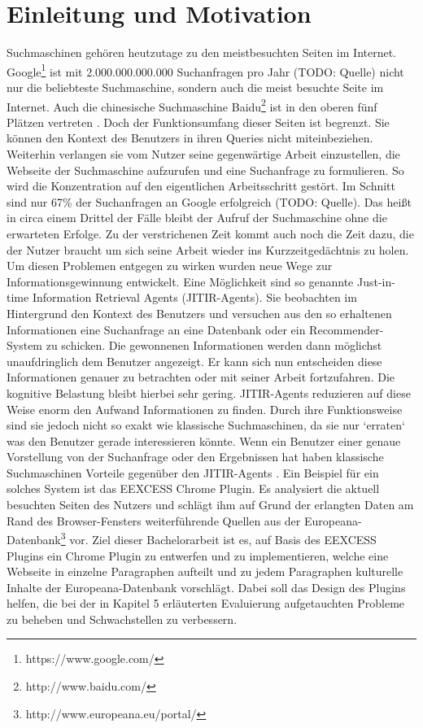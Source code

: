 \section{Einleitung und Motivation}
Suchmaschinen gehören heutzutage zu den meistbesuchten Seiten im Internet. Google\footnote{https://www.google.com/} ist mit 2.000.000.000.000 Suchanfragen pro Jahr (TODO: Quelle) nicht nur die beliebteste Suchmaschine, sondern auch die meist besuchte Seite im Internet. Auch die chinesische Suchmaschine Baidu\footnote{http://www.baidu.com/} ist in den oberen fünf Plätzen vertreten \cite{alexa}. Doch der Funktionsumfang dieser Seiten ist begrenzt.
Sie können den Kontext des Benutzers in ihren Queries nicht miteinbeziehen. Weiterhin verlangen sie vom Nutzer seine gegenwärtige Arbeit einzustellen, die Webseite der Suchmaschine aufzurufen und eine Suchanfrage zu formulieren. So wird die Konzentration auf den eigentlichen Arbeitsschritt gestört. Im Schnitt sind nur 67\% der Suchanfragen an Google erfolgreich (TODO: Quelle). Das heißt in circa einem Drittel der Fälle bleibt der Aufruf der Suchmaschine ohne die erwarteten Erfolge. Zu der verstrichenen Zeit kommt auch noch die Zeit dazu, die der Nutzer braucht um sich seine Arbeit wieder ins Kurzzeitgedächtnis zu holen.
Um diesen Problemen entgegen zu wirken wurden neue Wege zur Informationsgewinnung entwickelt. Eine Möglichkeit sind so genannte Just-in-time Information Retrieval Agents (JITIR-Agents)\cite{rhodes2000just}. Sie beobachten im Hintergrund den Kontext des Benutzers und versuchen aus den so erhaltenen Informationen eine Suchanfrage an eine Datenbank oder ein Recommender-System zu schicken. Die gewonnenen Informationen werden dann möglichst unaufdringlich dem Benutzer angezeigt. Er kann sich nun entscheiden diese Informationen genauer zu betrachten oder mit seiner Arbeit fortzufahren. Die kognitive Belastung bleibt hierbei sehr gering. JITIR-Agents reduzieren auf diese Weise enorm den Aufwand Informationen zu finden\cite{rhodes2000just}.
Durch ihre Funktionsweise sind sie jedoch nicht so exakt wie klassische Suchmaschinen, da sie nur `erraten` was den Benutzer gerade interessieren könnte. Wenn ein Benutzer einer genaue Vorstellung von der Suchanfrage oder den Ergebnissen hat haben klassische Suchmaschinen Vorteile gegenüber den JITIR-Agents \cite{rhodes2000just}.
Ein Beispiel für ein solches System ist das EEXCESS Chrome Plugin. Es analysiert die aktuell besuchten Seiten des Nutzers und schlägt ihm auf Grund der erlangten Daten am Rand des Browser-Fensters weiterführende Quellen aus der Europeana-Datenbank\footnote{http://www.europeana.eu/portal/} vor.
Ziel dieser Bachelorarbeit ist es, auf Basis des EEXCESS Plugins ein Chrome Plugin zu entwerfen und zu implementieren, welche eine Webseite in einzelne Paragraphen aufteilt und zu jedem Paragraphen kulturelle Inhalte der Europeana-Datenbank vorschlägt. Dabei soll das Design des Plugins helfen, die bei der in Kapitel 5 erläuterten Evaluierung aufgetauchten Probleme zu beheben und Schwachstellen zu verbessern.


